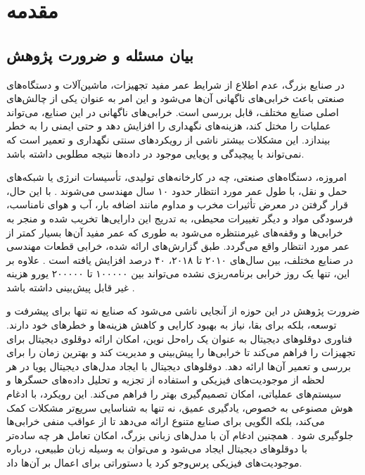 \chapter{مقدمه}

\section{بیان مسئله و ضرورت پژوهش}

در صنایع بزرگ، عدم اطلاع از شرایط عمر مفید تجهیزات، ماشین‌آلات و دستگاه‌های صنعتی باعث خرابی‌های ناگهانی آن‌ها می‌شود و این امر به عنوان یکی از چالش‌های اصلی صنایع مختلف، قابل بررسی است. خرابی‌های ناگهانی در این صنایع، می‌تواند عملیات را مختل کند، هزینه‌های نگهداری را افزایش دهد و حتی ایمنی را به خطر بیندازد. این مشکلات بیشتر ناشی از رویکردهای سنتی نگهداری و تعمیر است که نمی‌تواند با پیچیدگی‌ و پویایی موجود در داده‌ها نتیجه مطلوبی داشته باشد\cite{ismail2025systematic}.


امروزه، دستگاه‌های صنعتی، چه در کارخانه‌های تولیدی، تأسیسات انرژی یا شبکه‌های حمل و نقل، با طول عمر مورد انتظار حدود ۱۰ سال مهندسی می‌شوند \cite{aivaliotis2021degradation}.
 با این حال، قرار گرفتن در معرض تأثیرات مخرب و مداوم مانند اضافه بار، آب و هوای نامناسب، فرسودگی مواد و دیگر تغییرات محیطی، به تدریج این دارایی‌ها تخریب شده و منجر به خرابی‌ها و وقفه‌های غیرمنتظره می‌شود به طوری که عمر مفید آن‌ها بسیار کمتر از عمر مورد انتظار واقع می‌گردد.
  طبق گزارش‌های ارائه شده، خرابی قطعات مهندسی در صنایع مختلف، بین سال‌های ۲۰۱۰ تا ۲۰۱۸، ۴۰ درصد افزایش یافته است \cite{corchado2019failure}. علاوه بر این، تنها یک روز خرابی برنامه‌ریزی نشده می‌تواند بین ۱۰۰۰۰۰ تا ۲۰۰۰۰۰ یورو هزینه غیر قابل پیش‌بینی داشته باشد \cite{mathur2001reasoning}.
  
ضرورت پژوهش در این حوزه از آنجایی ناشی می‌شود که صنایع نه تنها برای پیشرفت و توسعه، بلکه برای بقا، نیاز به بهبود کارایی و کاهش هزینه‌ها و خطر‌های خود دارند. فناوری دوقلوهای دیجیتال به عنوان یک راه‌حل نوین، امکان ارائه دوقلوی دیجیتال برای تجهیزات را فراهم می‌کند تا خرابی‌ها را پیش‌بینی و مدیریت کند و بهترین‌ زمان را برای بررسی و تعمیر آن‌ها ارائه دهد\cite{tao2019digital}.
 دوقلوهای دیجیتال با ایجاد مدل‌های دیجیتال پویا در هر لحظه از موجودیت‌های فیزیکی و استفاده از تجزیه و تحلیل داده‌های حسگرها و سیستم‌های عملیاتی، امکان تصمیم‌گیری بهتر را فراهم می‌کند\cite{vandinter2022predictive}. 
 این رویکرد، با ادغام هوش مصنوعی به خصوص، یادگیری عمیق، نه تنها به شناسایی سریع‌تر مشکلات کمک می‌کند، بلکه الگویی برای صنایع متنوع ارائه می‌دهد تا از عواقب منفی خرابی‌ها جلوگیری شود\cite{lv2024artificial} \cite{kreuzer2024artificial}. همچنین ادغام آن با مدل‌های زبانی بزرگ، امکان تعامل هر چه ساده‌تر با دوقلو‌های دیجیتال ایجاد می‌شود و می‌توان به وسیله زبان طبیعی، درباره موجودیت‌های فیزیکی پرس‌وجو کرد یا دستوراتی برای اعمال بر آن‌ها داد\cite{CHEN2025102982LLMDT}.
  
